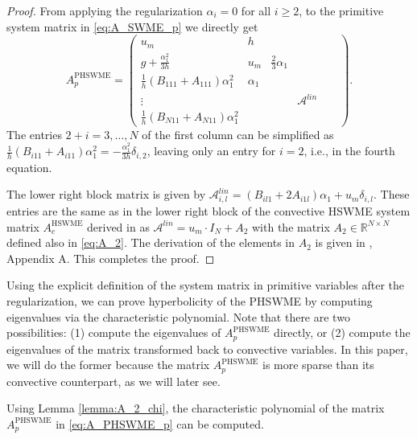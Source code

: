 \documentclass[a4paper, 11pt]{article}
\begin{document}
\begin{proof}
    From applying the regularization $\alpha_i = 0$ for all $i\geq2$, to the primitive system matrix in \eqref{eq:A_SWME_p} we directly get
    \begin{equation}\label{eq:A_lin_p}
        A^{\textrm{PHSWME}}_{p} =
        \left(\begin{array}{cccccc}
        u_m & h &   &   &   &   \\
        g + \frac{\alpha_1^2}{3 h} & u_m & \frac{2}{3} \alpha_1 &   &   &  \\
        \frac{1}{h}\left(B_{111} + A_{111} \right) \alpha_1^2 & \alpha_1 &  & & &\\
        \vdots &  & & \mathcal{A}^{lin} & & \\
        \frac{1}{h}\left(B_{N11} + A_{N11} \right) \alpha_1^2 &  &  & & &
        \end{array}\right).
    \end{equation}
    The entries $2+i=3, \ldots, N$ of the first column can be simplified as $\frac{1}{h}\left(B_{i11} + A_{i11} \right) \alpha_1^2 = -\frac{\alpha_1^2}{3h} \delta_{i,2}$, leaving only an entry for $i=2$, i.e., in the fourth equation.

    The lower right block matrix is given by $\mathcal{A}^{lin}_{i,l} = \left( B_{il1} + 2 A_{i1l} \right) \alpha_1 + u_m \delta_{i,l}$. These entries are the same as in the lower right block of the convective HSWME system matrix $A^{\textrm{HSWME}}_{c}$ derived in \cite{Koellermeier2020c} as $\mathcal{A}^{lin} = u_m \cdot I_N + A_2$ with the matrix $A_2 \in \mathbb{R}^{N \times N}$ defined also in \eqref{eq:A_2}. The derivation of the elements in $A_2$ is given in \cite{Koellermeier2020c}, Appendix A. This completes the proof.
\end{proof}

Using the explicit definition of the system matrix in primitive variables after the regularization, we can prove hyperbolicity of the PHSWME by computing eigenvalues via the characteristic polynomial. Note that there are two possibilities: (1) compute the eigenvalues of $A^{\textrm{PHSWME}}_{p}$ directly, or (2) compute the eigenvalues of the matrix transformed back to convective variables. In this paper, we will do the former because the matrix $A^{\textrm{PHSWME}}_{p}$ is more sparse than its convective counterpart, as we will later see.

Using Lemma \ref{lemma:A_2_chi}, the characteristic polynomial of the matrix $A^{\textrm{PHSWME}}_{p}$ in \eqref{eq:A_PHSWME_p} can be computed.
\end{document}
